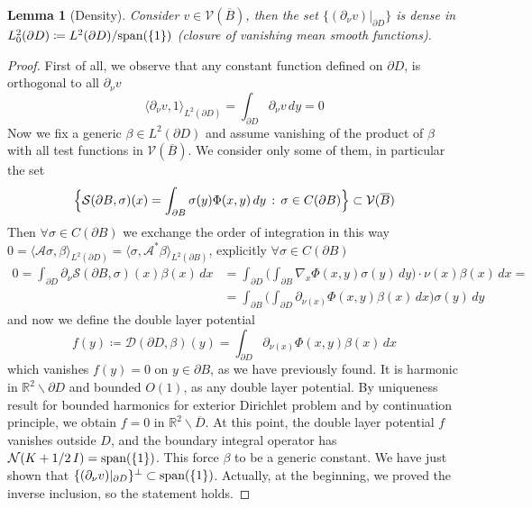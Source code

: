 \documentclass[10pt, a4paper, twoside, openright]{book}
\theoremstyle{definition}
\theoremstyle{plain}
\theoremstyle{plain}
\theoremstyle{plain}
\theoremstyle{plain}
\theoremstyle{plain}
\newtheorem{lemma}[subsection]{Lemma}
\theoremstyle{plain}
\theoremstyle{plain}
\theoremstyle{plain}
\begin{document}
\begin{lemma}[Density]
\label{lemma:density-V-1}
 Consider $v\in \mathcal{V}(\overline{B})$, then the set $\{(\partial_\nu v )|_{\partial D}\}$ is dense in $L^2_0(\partial D)\coloneqq L^2(\partial D)/\textup{span}(\{1\})$ (closure of vanishing mean smooth functions).
\end{lemma}
\begin{proof}
 First of all, we observe that any constant function defined on $\partial D$, is orthogonal to all $\partial_\nu v$
 \begin{equation*}
  \langle \partial_\nu v, 1\rangle_{L^2(\partial D)} = \int_{\partial D}\partial_\nu v\,dy=0
 \end{equation*}
 Now we fix a generic $\beta\in L^2(\partial D)$ and assume vanishing of the product of $\beta$ with all test functions in $\mathcal{V}(\overline{B})$. 
 We consider only some of them, in particular the set
 \begin{equation}
  \Bigl\{\mathcal{S}(\partial B, \sigma)(x) = \int_{\partial B} \sigma(y)\Phi(x,y)\,dy\,:\, \sigma \in C(\partial B)\Bigr\} \subset \mathcal{V}(\overline{B})
 \end{equation}
 Then $\forall\sigma\in C(\partial B)$ we exchange the order of integration in this way $0=\langle\mathcal{A}\sigma,\beta\rangle_{L^2(\partial D)} =\langle\sigma,\mathcal{A}^*\beta\rangle_{L^2(\partial B)}$, explicitly $\forall\sigma\in C(\partial B)$
 \begin{align*}
  0 = \int_{\partial D}\partial_\nu \mathcal{S}(\partial B, \sigma)(x) \beta(x) \, dx &= \int_{\partial D}\Big( \int_{\partial B}\nabla_x \Phi(x,y) \sigma(y)\,dy\Big)\cdot\nu(x)\beta(x) \, dx = \\
   &= \int_{\partial B}\Big( \int_{\partial D}\partial_{\nu(x)} \Phi(x,y) \beta(x)\,dx\Big)\sigma(y) \, dy
 \end{align*}
 and now we define the double layer potential
 \begin{equation}
  f(y)\coloneqq \mathcal{D}(\partial D, \beta)(y)=\int_{\partial D}\partial_{\nu(x)} \Phi(x,y) \beta(x)\,dx
 \end{equation}
 which vanishes $f(y)=0$ on $y\in\partial B$, as we have previously found.
 It is harmonic in $\mathbb{R}^2\backslash\partial D$ and bounded $O(1)$, as any double layer potential. By uniqueness result for bounded harmonics for exterior Dirichlet problem and by continuation principle, we obtain $f=0$ in $\mathbb{R}^2\backslash\overline{D}$. At this point, the double layer potential $f$ vanishes outside $D$, and the boundary integral operator has $\mathcal{N}(K+1/2\,I)=\textup{span}(\{1\})$. This force $\beta$ to be a generic constant. 
 We have just shown that $\{(\partial_\nu v )|_{\partial D}\}^\perp \subset \textup{span}(\{1\})$. Actually, at the beginning, we proved the inverse inclusion, so the statement holds.
\end{proof}
\end{document}
